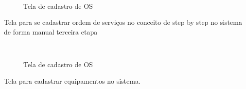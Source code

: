 \begin{figure}[H]
		\caption{\label{step_2}Tela de cadastro de OS}
	\centering
	\mbox{%
		\qquad
	}
	
\end{figure}
\newpage

Tela para se cadastrar ordem de serviços no conceito de  step by step no sistema de forma manual terceira etapa

\begin{figure}[H]
		\caption{\label{step_3}Tela de cadastro de OS}
	\centering
	\mbox{%
		\qquad
	}
	
\end{figure}
\newpage

Tela para cadastrar equipamentos no sistema.

